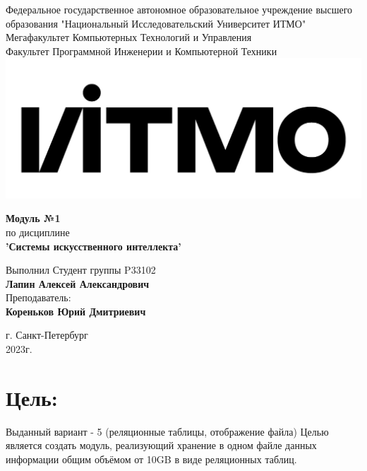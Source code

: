 \documentclass[12pt,onecolumn]{article}
\begin{document}
\setcounter{tocdepth}{4}
\begin{center}
    Федеральное государственное автономное образовательное учреждение высшего образования "Национальный Исследовательский Университет ИТМО"\\ 
    Мегафакультет Компьютерных Технологий и Управления\\
    Факультет Программной Инженерии и Компьютерной Техники \\
    \includegraphics[scale=0.3]{image/itmo.jpg} %
\end{center}
\vspace{1cm}


\begin{center}
    \textbf{Модуль №1}\\
    по дисциплине\\
    \textbf{'Системы искусственного интеллекта'}
\end{center}

\vspace{2cm}

\begin{flushright}
  Выполнил Студент  группы P33102\\
  \textbf{Лапин Алексей Александрович}\\
  Преподаватель: \\
  \textbf{Кореньков Юрий Дмитриевич}\\
\end{flushright}

\vspace{6cm}
\begin{center}
    г. Санкт-Петербург\\
    2023г.
\end{center}

\newpage
\tableofcontents
\newpage

\section{Цель:}
Выданный вариант - 5 (реляционные таблицы, отображение файла)
Целью является создать модуль, реализующий хранение в одном файле данных информации общим объёмом от 10GB в виде реляционных таблиц.
\end{document}
